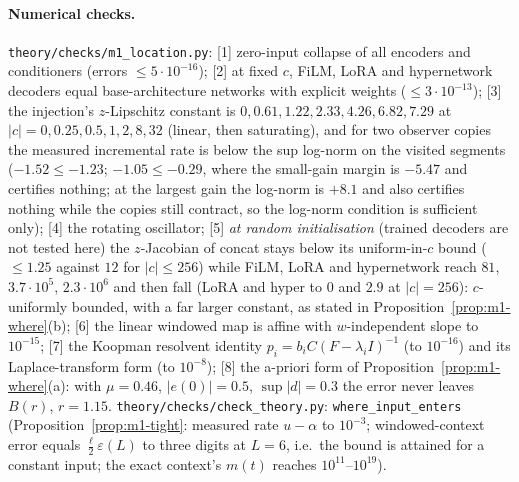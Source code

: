 \paragraph{Numerical checks.} \texttt{theory/checks/m1\_location.py}: [1] zero-input collapse of all encoders and
conditioners (errors $\le5\cdot10^{-16}$); [2] at fixed $c$, FiLM, LoRA and hypernetwork decoders equal base-architecture
networks with explicit weights ($\le3\cdot10^{-13}$); [3] the injection's $z$-Lipschitz constant is $0,0.61,1.22,2.33,4.26,6.82,7.29$ at
$|c|=0,0.25,0.5,1,2,8,32$ (linear, then saturating), and for two observer copies the measured incremental rate is below the
sup log-norm on the visited segments ($-1.52\le-1.23$; $-1.05\le-0.29$, where the small-gain margin is $-5.47$ and certifies
nothing; at the largest gain the log-norm is $+8.1$ and also certifies nothing while the copies still contract, so the
log-norm condition is sufficient only); [4] the rotating oscillator; [5] \emph{at random initialisation} (trained
decoders are not tested here) the $z$-Jacobian of concat stays below its uniform-in-$c$ bound ($\le1.25$ against $12$ for
$|c|\le256$) while FiLM, LoRA and hypernetwork reach $81$, $3.7\cdot10^5$, $2.3\cdot10^6$ and then fall (LoRA and
hyper to $0$ and $2.9$ at $|c|=256$): $c$-uniformly bounded, with a far larger constant, as stated in
Proposition~\ref{prop:m1-where}(b); [6] the linear windowed map is affine with $w$-independent slope to $10^{-15}$;
[7] the Koopman resolvent identity $p_i=b_iC(F-\lambda_iI)^{-1}$ (to $10^{-16}$) and its Laplace-transform form (to
$10^{-8}$); [8] the a-priori form of Proposition~\ref{prop:m1-where}(a): with $\mu=0.46$, $|e(0)|=0.5$, $\sup|d|=0.3$ the
error never leaves $B(r)$, $r=1.15$. \texttt{theory/checks/check\_theory.py}: \texttt{where\_input\_enters}
(Proposition~\ref{prop:m1-tight}: measured rate $u-\alpha$ to $10^{-3}$; windowed-context error equals
$\tfrac{\ell}{2}\varepsilon(L)$ to three digits at $L=6$, i.e.\ the bound is attained for a constant input; the exact
context's $m(t)$ reaches $10^{11}$--$10^{19}$).

